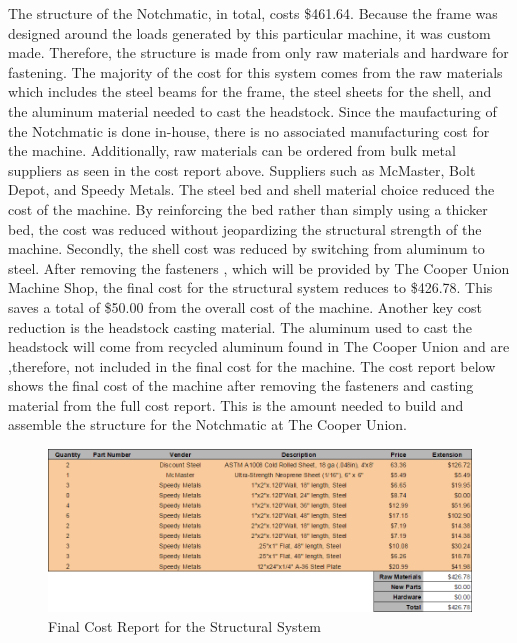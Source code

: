 The structure of the Notchmatic, in total, costs \$461.64. Because the frame was designed around the loads generated by this particular machine, it was custom made. Therefore, the structure is made from only raw materials and hardware for fastening. The majority of the cost for this system comes from the raw materials which includes the steel beams for the frame, the steel sheets for the shell, and the aluminum material needed to cast the headstock. Since the maufacturing of the Notchmatic is done in-house, there is no associated manufacturing cost for the machine. Additionally, raw materials can be ordered from bulk metal suppliers as seen in  the cost report above. Suppliers such as McMaster, Bolt Depot, and Speedy Metals. The steel bed and shell material choice reduced the cost of the machine. By reinforcing the bed rather than simply using a thicker bed, the cost was reduced without jeopardizing the structural strength of the machine. Secondly, the shell cost was reduced by switching from aluminum to steel. After removing the fasteners , which will be provided by The Cooper Union Machine Shop, the final cost for the structural system reduces to \$426.78. This saves a total of \$50.00 from the overall cost of the machine. Another key cost reduction is the headstock casting material. The aluminum used to cast the headstock will come from recycled aluminum found in The Cooper Union and are ,therefore, not included in the final cost for the machine. The cost report below shows the final cost of the machine after removing the fasteners and casting material from the full cost report. This is the amount needed to build and assemble the structure for the Notchmatic at The Cooper Union.

\begin{figure}[htp]
    \centering
    \includegraphics[width=1.0\textwidth]{./fall-report pictures/Chapter4-BillofMaterials/FCRS}
    \caption{Final Cost Report for the Structural System}
    \label{fig:FCRS}
\end{figure}



